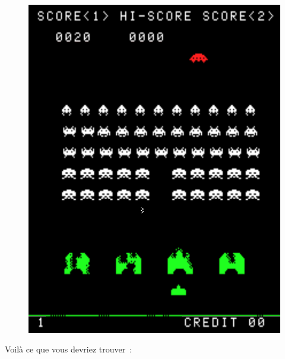 \begin{figure}[!hb]
  \begin{center}
    \includegraphics[scale=0.462]{images/space_game1.png}
  \end{center}
\end{figure}

Voilà ce que vous devriez trouver~:


